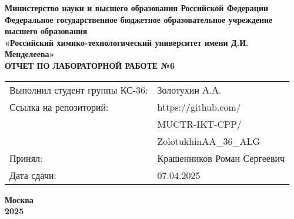\documentclass[12pt, a4paper]{report}
\begin{document}
	\begin{titlepage}
		\begin{center}
			\large \textbf{Министерство науки и высшего образования Российской Федерации} \\
			\large \textbf{Федеральное государственное бюджетное образовательное учреждение высшего образования} \\
			\large \textbf{«Российский химико-технологический университет имени Д.И. Менделеева»} \\

			\vspace*{4cm}
			\LARGE \textbf{ОТЧЕТ ПО ЛАБОРАТОРНОЙ РАБОТЕ №6}

			\vspace*{4cm}
			\begin{flushright}
				\Large
				\begin{tabular}{>{\raggedleft\arraybackslash}p{9cm} p{10cm}}
					Выполнил студент группы КС-36: & Золотухин А.А. \\
					Ссылка на репозиторий: & https://github.com/ \\
					& MUCTR-IKT-CPP/ \\
					& ZolotukhinAA\_36\_ALG \\
					Принял: & Крашенников Роман Сергеевич \\
					Дата сдачи: & 07.04.2025 \\
				\end{tabular}
			\end{flushright}

			\vspace*{6cm}
			\Large \textbf{Москва \\ 2025}
		\end{center}
	\end{titlepage}

	\tableofcontents
	\thispagestyle{empty}
	\newpage

\end{document}
